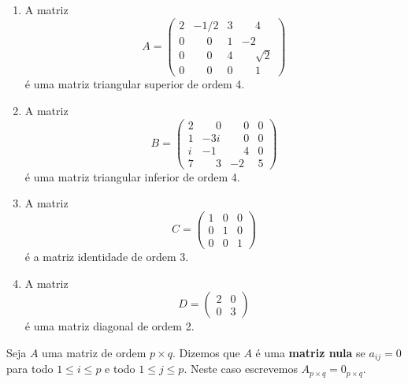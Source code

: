 \begin{exemplos}
    \begin{enumerate}[label={\arabic*})]
        \item A matriz
            \[
                A = \begin{pmatrix}
                    2 & -1/2 & 3 & \phantom{-}4\\
                    0 & \phantom{-}0 & 1 & -2\\
                    0 & \phantom{-}0 & 4 & \phantom{-}\sqrt{2}\\
                    0 & \phantom{-}0 & 0 & \phantom{-}1
                \end{pmatrix}
            \]
        é uma matriz triangular superior de ordem 4.
        \item A matriz
            \[
                B = \begin{pmatrix}
                    2 & \phantom{-}0 & \phantom{-}0 & 0\\
                    1 & -3i & \phantom{-}0 & 0\\
                    i & -1 & \phantom{-}4 & 0\\
                    7 & \phantom{-}3 & -2 & 5
                \end{pmatrix}
            \]
        é uma matriz triangular inferior de ordem 4.
        \item A matriz
            \[
                C = \begin{pmatrix}
                    1 & 0 & 0\\
                    0 & 1 & 0\\
                    0 & 0 & 1
                \end{pmatrix}
            \]
        é a matriz identidade de ordem 3.
        \item A matriz
            \[
                D = \begin{pmatrix}
                    2 & 0\\
                    0 & 3
                \end{pmatrix}
            \]
        é uma matriz diagonal de ordem 2.
    \end{enumerate}
\end{exemplos}

\begin{definicao}
    Seja $A$ uma matriz de ordem $p\times q$. Dizemos que $A$ é uma \textbf{matriz nula} se $a_{ij} = 0$ para todo $1 \le i \le p$ e todo $1 \le j \le p$. Neste caso escrevemos $A_{p\times q} = 0_{p\times q}$.
\end{definicao}

